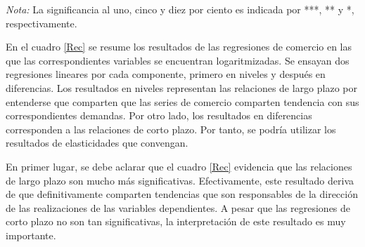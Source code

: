 \documentclass[12pt,letterpaper]{article}
\begin{document}
\begin{table}
\caption{Regresiones de Comercio}
\begin{center}
\end{center}
\begin{scriptsize}
\emph{Nota:} La significancia al uno, cinco y diez por ciento es indicada por ***, ** y *, respectivamente.
\end{scriptsize}								
\label{Rec}	
\end{table}	

En el cuadro \ref{Rec} se resume los resultados de las regresiones de comercio en las que las correspondientes variables se encuentran logaritmizadas. Se ensayan dos regresiones lineares por cada componente, primero en niveles y después en diferencias. Los resultados en niveles representan las relaciones de largo plazo por entenderse que comparten que las series de comercio comparten tendencia con sus correspondientes demandas. Por otro lado, los resultados en diferencias corresponden a las relaciones de corto plazo. Por tanto, se podría utilizar los resultados de elasticidades que convengan.

En primer lugar, se debe aclarar que el cuadro \ref{Rec} evidencia que las relaciones de largo plazo son mucho más significativas. Efectivamente, este resultado deriva de que definitivamente comparten tendencias que son responsables de la dirección de las realizaciones de las variables dependientes. A pesar que las regresiones de corto plazo no son tan significativas, la interpretación de este resultado es muy importante. 
\end{document}
